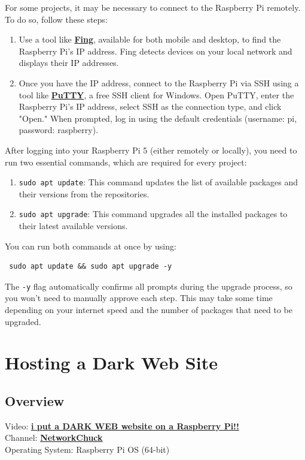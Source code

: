 \documentclass[a4paper,12pt]{article}
\begin{document}
For some projects, it may be necessary to connect to the Raspberry Pi remotely. To do so, follow these steps:
\begin{enumerate}
\item Use a tool like \href{https://www.fing.com/}{\textbf{\color{blue}Fing}}, available for both mobile and desktop, to find the Raspberry Pi's IP address. Fing detects devices on your local network and displays their IP addresses. 
\item Once you have the IP address, connect to the Raspberry Pi via SSH using a tool like \href{https://www.chiark.greenend.org.uk/~sgtatham/putty/}{\textbf{\color{blue}PuTTY}}, a free SSH client for Windows. Open PuTTY, enter the Raspberry Pi's IP address, select SSH as the connection type, and click "Open." When prompted, log in using the default credentials (username: pi, password: raspberry).
\end{enumerate}

After logging into your Raspberry Pi 5 (either remotely or locally), you need to run two essential commands, which are required for every project:
\begin{enumerate}
\item \texttt{sudo apt update}: This command updates the list of available packages and their versions from the repositories.
\item \texttt{sudo apt upgrade}: This command upgrades all the installed packages to their latest available versions.
\end{enumerate}

You can run both commands at once by using:
\begin{verbatim} sudo apt update && sudo apt upgrade -y \end{verbatim}

The \texttt{-y} flag automatically confirms all prompts during the upgrade process, so you won't need to manually approve each step. This may take some time depending on your internet speed and the number of packages that need to be upgraded.

\section{Hosting a Dark Web Site}

\subsection{Overview}
Video: \href{https://www.youtube.com/watch?v=bllS9tkCkaM}{\textbf{\color{blue}i put a DARK WEB website on a Raspberry Pi!!}} \\
Channel: \href{https://www.youtube.com/@NetworkChuck}{\textbf{\color{blue}NetworkChuck}} \\
Operating System: Raspberry Pi OS (64-bit)
\end{document}
